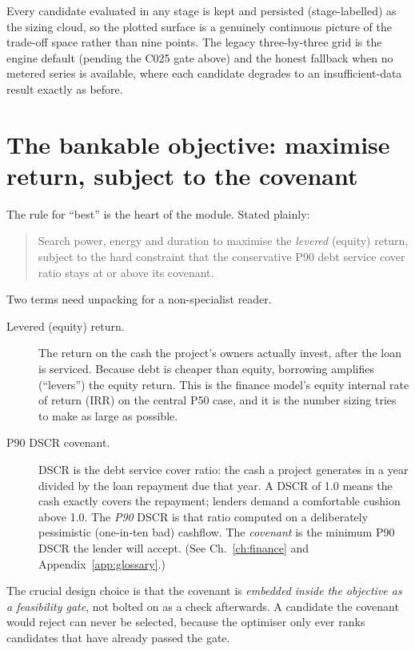 Every candidate evaluated in any stage is kept and persisted (stage-labelled) as the sizing cloud, so the plotted surface is a genuinely continuous picture of the trade-off space rather than nine points. The legacy three-by-three grid is the engine default (pending the C025 gate above) and the honest fallback when no metered series is available, where each candidate degrades to an insufficient-data result exactly as before.

\section{The bankable objective: maximise return, subject to the covenant}

The rule for ``best'' is the heart of the module. Stated plainly:

\begin{quote}\sffamily
Search power, energy and duration to maximise the \emph{levered} (equity) return, subject to the hard constraint that the conservative P90 debt service cover ratio stays at or above its covenant.
\end{quote}

Two terms need unpacking for a non-specialist reader.

\begin{description}
  \item[Levered (equity) return.] The return on the cash the project's owners actually invest, after the loan is serviced. Because debt is cheaper than equity, borrowing amplifies (``levers'') the equity return. This is the finance model's equity internal rate of return (IRR) on the central P50 case, and it is the number sizing tries to make as large as possible.
  \item[P90 DSCR covenant.] DSCR is the debt service cover ratio: the cash a project generates in a year divided by the loan repayment due that year. A DSCR of 1.0 means the cash exactly covers the repayment; lenders demand a comfortable cushion above 1.0. The \emph{P90} DSCR is that ratio computed on a deliberately pessimistic (one-in-ten bad) cashflow. The \emph{covenant} is the minimum P90 DSCR the lender will accept. (See Ch.~\ref{ch:finance} and Appendix~\ref{app:glossary}.)
\end{description}

The crucial design choice is that the covenant is \emph{embedded inside the objective as a feasibility gate}, not bolted on as a check afterwards. A candidate the covenant would reject can never be selected, because the optimiser only ever ranks candidates that have already passed the gate.

